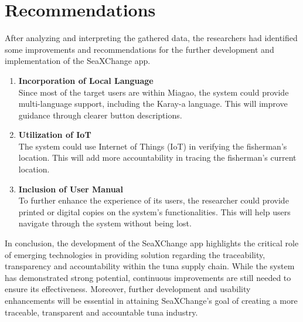 \section{Recommendations}
After analyzing and interpreting the gathered data, the researchers had identified some improvements and recommendations for the further development and implementation of the SeaXChange app.
	\begin{enumerate}
		\item \textbf{Incorporation of Local Language}
		\\Since most of the target users are within Miagao, the system could provide multi-language support, including the Karay-a language. This will improve guidance through clearer button descriptions.
		
		\item \textbf{Utilization of IoT}
		\\The system could use Internet of Things (IoT) in verifying the fisherman's location. This will add more accountability in tracing the fisherman's current location.
		
		\item \textbf{Inclusion of User Manual }
		\\To further enhance the experience of its users, the researcher could provide printed or digital copies on the system's functionalities. This will help users navigate through the system without being lost.
	\end{enumerate}
	
	
\noindent In conclusion, the development of the SeaXChange app highlights the critical role of emerging technologies in providing solution regarding the traceability, transparency and accountability within the tuna supply chain. While the system has demonstrated strong potential, continuous improvements are still needed to ensure its effectiveness. Moreover, further development and usability enhancements will be essential in attaining SeaXChange's goal of creating a more traceable, transparent and accountable tuna industry.


